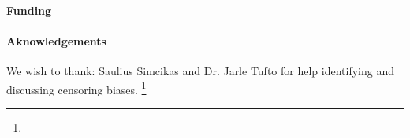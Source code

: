 \maketitle
\begin{abstract}
  
\end{abstract}
\paragraph{Funding} %
\paragraph{Aknowledgements}
We wish to thank:
Saulius Simcikas and Dr. Jarle Tufto
for help identifying and discussing censoring biases.%
\footnote{}
\clearpage